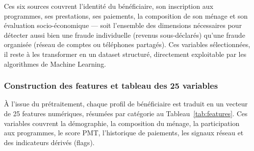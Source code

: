 \documentclass[a4paper, oneside, 12pt]{book}
\begin{document}
\hspace{0.5cm}Ces six sources couvrent l'identité du bénéficiaire, son inscription aux programmes, ses prestations, ses paiements, la composition de son ménage et son évaluation socio-économique — soit l'ensemble des dimensions nécessaires pour détecter aussi bien une fraude individuelle (revenus sous-déclarés) qu'une fraude organisée (réseau de comptes ou téléphones partagés). Ces variables sélectionnées, il reste à les transformer en un dataset structuré, directement exploitable par les algorithmes de Machine Learning.

\subsubsection{Construction des features et tableau des 25 variables}

\hspace{0.5cm}À l'issue du prétraitement, chaque profil de bénéficiaire est traduit en un vecteur de 25 features numériques, résumées par catégorie au Tableau~\ref{tab:features}. Ces variables couvrent la démographie, la composition du ménage, la participation aux programmes, le score PMT, l'historique de paiements, les signaux réseau et des indicateurs dérivés (flags).
\end{document}
